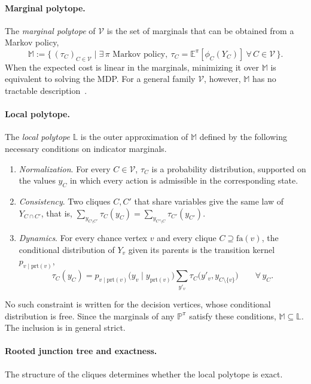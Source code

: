 \documentclass{article}
\begin{document}
\paragraph{Marginal polytope.}
The \emph{marginal polytope} of $\mathcal{V}$ is the set of marginals that can be obtained from a Markov policy,
\[
  \mathbb{M} := \bigl\{\,(\tau_C)_{C\in\mathcal{V}} \;\big|\; \exists\,\pi \text{ Markov policy},\
  \tau_C = \mathbb{E}^\pi[\phi_C(Y_C)]\ \forall\,C\in\mathcal{V}\,\bigr\}.
\]
When the expected cost is linear in the marginals, minimizing it over $\mathbb{M}$ is equivalent to solving the MDP.
For a general family $\mathcal{V}$, however, $\mathbb{M}$ has no tractable description~\cite{wainwright2008graphical}.

\paragraph{Local polytope.}
The \emph{local polytope} $\mathbb{L}$ is the outer approximation of $\mathbb{M}$ defined by the following
necessary conditions on indicator marginals.
\begin{enumerate}
  \item \emph{Normalization}. For every $C \in \mathcal{V}$, $\tau_C$ is a probability distribution, supported on the
        values $y_C$ in which every action is admissible in the corresponding state.
  \item \emph{Consistency}. Two cliques $C, C'$ that share variables give the same law of $Y_{C \cap C'}$, that is,
        $\sum_{y_{C \setminus C'}} \tau_C(y_C) = \sum_{y_{C' \setminus C}} \tau_{C'}(y_{C'})$.
  \item \emph{Dynamics}. For every chance vertex $v$ and every clique $C \supseteq \mathrm{fa}(v)$, the conditional
        distribution of $Y_v$ given its parents is the transition kernel $p_{v \mid \mathrm{prt}(v)}$,
        \[
          \tau_C(y_C) = p_{v \mid \mathrm{prt}(v)}\bigl(y_v \mid y_{\mathrm{prt}(v)}\bigr)
          \sum_{y'_v} \tau_C\bigl(y'_v, y_{C \setminus \{v\}}\bigr) \qquad \forall\, y_C.
        \]
\end{enumerate}
No such constraint is written for the decision vertices, whose conditional distribution is free. Since the marginals of
any $\mathbb{P}^\pi$ satisfy these conditions, $\mathbb{M} \subseteq \mathbb{L}$. The inclusion is in general strict.

\paragraph{Rooted junction tree and exactness.}
The structure of the cliques determines whether the local polytope is exact.
\end{document}
